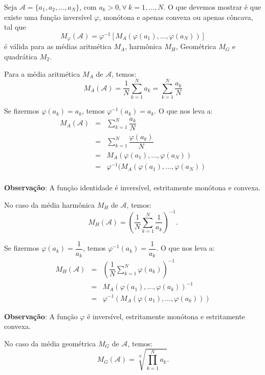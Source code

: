 Seja \(\mathcal{A} = \{a_1, a_2, \ldots, a_N\}\), com \(a_k>0, \forall\ k = 1, \ldots, N\). O que devemos mostrar é que existe uma função inversível \(\varphi\), monótona e apenas convexa ou apenas côncava, tal que
\[M_\varphi(\mathcal{A}) = \varphi^{-1}\left[M_A(\varphi(a_1), \ldots, \varphi(a_N))\right]\]
é válida para as médias aritmética \(M_A\), harmônica \(M_H\), Geométrica \(M_G\) e quadrática \(M_2\).

Para a média aritmética \(M_A\) de \(\mathcal{A}\), temos:
\[
M_A(\mathcal{A})
=  \dfrac{1}{N} \displaystyle\sum_{k=1}^{N} a_{k}
=  \displaystyle\sum_{k=1}^{N} \dfrac{a_{k}}{N}
\]

Se fizermos \(\varphi(a_k) = a_k\), temos \(\varphi^{-1}(a_k) = a_k\). O que nos leva a:
\[\begin{array}{rcl}
M_A(\mathcal{A})
&=& \displaystyle\sum_{k=1}^{N} \dfrac{a_{k}}{N} \\
&=& \displaystyle\sum_{k=1}^{N} \dfrac{\varphi(a_{k})}{N} \\
&=& M_A(\varphi(a_1), \ldots, \varphi(a_N)) \\
&=& \varphi^{-1}(M_A(\varphi(a_1), \ldots, \varphi(a_N)) \\
\end{array}\]

\textbf{Observação}: A função identidade é inversível, estritamente monótona e convexa.

No caso da média harmônica \(M_H\) de \(\mathcal{A}\), temos:
\[
M_H(\mathcal{A})
=  \left(\dfrac{1}{N} \displaystyle\sum_{k=1}^{N} \dfrac{1}{a_{k}}\right)^{-1}.
\]

Se fizermos \(\varphi(a_k) = \dfrac{1}{a_k}\), temos \(\varphi^{-1}(a_k) = \dfrac{1}{a_k}\). O que nos leva a:
\[\begin{array}{rcl}
M_H(\mathcal{A})
&=& \left(\dfrac{1}{N} \displaystyle\sum_{k=1}^{N} \varphi(a_{k})\right)^{-1} \\
&=& M_A\left(\varphi(a_1), \ldots, \varphi(a_k)\right)^{-1} \\
&=& \varphi^{-1}\left(M_A(\varphi(a_1), \ldots, \varphi(a_k))\right)
\end{array}\]

\textbf{Observação}: A função \(\varphi\) é inversível, estritamente monótona e estritamente convexa.




No caso da média geométrica \(M_G\) de \(\mathcal{A}\), temos:
\[
M_G(\mathcal{A})
= \displaystyle\sqrt[N]{\prod_{k=1}^{N} a_{k}}.
\]

